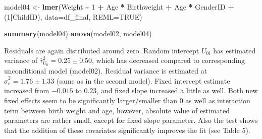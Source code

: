 \documentclass[
  12pt,
]{article}
\newenvironment{Shaded}{\begin{snugshade}}{\end{snugshade}}
\newcommand{\AttributeTok}[1]{\textcolor[rgb]{0.13,0.29,0.53}{#1}}
\newcommand{\ConstantTok}[1]{\textcolor[rgb]{0.56,0.35,0.01}{#1}}
\newcommand{\DecValTok}[1]{\textcolor[rgb]{0.00,0.00,0.81}{#1}}
\newcommand{\FunctionTok}[1]{\textcolor[rgb]{0.13,0.29,0.53}{\textbf{#1}}}
\newcommand{\NormalTok}[1]{#1}
\newcommand{\OtherTok}[1]{\textcolor[rgb]{0.56,0.35,0.01}{#1}}
\newcommand{\SpecialCharTok}[1]{\textcolor[rgb]{0.81,0.36,0.00}{\textbf{#1}}}
\begin{document}
\begin{Shaded}
\begin{Highlighting}[]
\NormalTok{model04 }\OtherTok{\textless{}{-}} \FunctionTok{lmer}\NormalTok{(Weight }\SpecialCharTok{\textasciitilde{}} \DecValTok{1} \SpecialCharTok{+}\NormalTok{ Age }\SpecialCharTok{*}\NormalTok{ Birthweight }\SpecialCharTok{+}\NormalTok{ Age }\SpecialCharTok{*}\NormalTok{ GenderID }\SpecialCharTok{+}\NormalTok{ (}\DecValTok{1}\SpecialCharTok{|}\NormalTok{ChildID), }
                \AttributeTok{data=}\NormalTok{df\_final, }\AttributeTok{REML=}\ConstantTok{TRUE}\NormalTok{)}
\end{Highlighting}
\end{Shaded}

\begin{Shaded}
\begin{Highlighting}[]
\FunctionTok{summary}\NormalTok{(model04)}
\FunctionTok{anova}\NormalTok{(model02, model04)}
\end{Highlighting}
\end{Shaded}

Residuals are again distributed around zero. Random intercept \(U_{0i}\)
has estimated variance of \(\hat \tau_{U_0}^2 = 0.25 \pm 0.50\), which
has decreased compared to corresponding unconditional model (model02).
Residual variance is estimated at \(\hat \sigma_e^2 = 1.76 \pm 1.33\)
(same as in the second model). Fixed intercept estimate increased from
\(-0.015\) to \(0.23\), and fixed slope increased a little as well. Both
new fixed effects seem to be significantly larger/smaller than 0 as well
as interaction term between birth weight and age, however, absolute
value of estimated parameters are rather small, except for fixed slope
parameter. Also the test shows that the addition of these covariates
significantly improves the fit (see Table 5).
\end{document}

